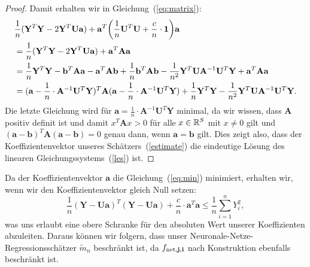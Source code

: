 \begin{proof}
Damit erhalten wir in Gleichung~(\ref{eq:matrix}):
\begin{equation*}
\begin{split}
& \frac{1}{n}(\mathbf{Y}^T\mathbf{Y} - 2\mathbf{Y}^T\mathbf{U}\mathbf{a}) + \mathbf{a}^T\bigg(\frac{1}{n} \mathbf{U}^T\mathbf{U} + \frac{c}{n} \cdot \mathbf{1}\bigg) \mathbf{a} \\
& = \frac{1}{n}(\mathbf{Y}^T\mathbf{Y} - 2\mathbf{Y}^T\mathbf{U}\mathbf{a}) + \mathbf{a}^T \mathbf{A} \mathbf{a} \\
& = \frac{1}{n}\mathbf{Y}^T\mathbf{Y} - \mathbf{b}^T\mathbf{A}\mathbf{a} - \mathbf{a}^T\mathbf{A}\mathbf{b} + \frac{1}{n}\mathbf{b}^T\mathbf{A}\mathbf{b} - \frac{1}{n^2}\mathbf{Y}^T\mathbf{U}\mathbf{A}^{-1}\mathbf{U}^T\mathbf{Y} + \mathbf{a}^T\mathbf{A}\mathbf{a} \\
& = (\mathbf{a} - \frac{1}{n} \cdot \mathbf{A}^{-1}\mathbf{U}^T\mathbf{Y})^T \mathbf{A} (\mathbf{a} - \frac{1}{n} \cdot \mathbf{A}^{-1} \mathbf{U}^T\mathbf{Y}) + \frac{1}{n}\mathbf{Y}^T\mathbf{Y} - \frac{1}{n^2}\mathbf{Y}^T\mathbf{U}\mathbf{A}^{-1}\mathbf{U}^T\mathbf{Y}.
\end{split} 
\end{equation*} 
Die letzte Gleichung wird für $\mathbf{a} = \frac{1}{n} \cdot \mathbf{A}^{-1}\mathbf{U}^T\mathbf{Y}$ minimal, 
da wir wissen, dass $\mathbf{A}$ positiv definit ist und damit $x^T\mathbf{A}x > 0$ für alle $x \in \mathbb{R}^S$ mit $x \neq 0$ gilt und $(\mathbf{a} - \mathbf{b})^T\mathbf{A}(\mathbf{a} - \mathbf{b}) = 0$ genau dann, wenn $\mathbf{a} = \mathbf{b}$ gilt.
Dies zeigt also, dass der Koeffizientenvektor unseres Schätzers~(\ref{estimate}) die eindeutige Lösung des linearen Gleichungssystems~(\ref{les}) ist.
\end{proof}
\begin{bemnumber}
\label{mtildebeschraenkt}
Da der Koeffizientenvektor $\mathbf{a}$ die Gleichung~(\ref{eq:min}) minimiert, erhalten wir, wenn wir den Koeffizientenvektor gleich Null setzen:
$$\frac{1}{n}(\mathbf{Y} - \mathbf{U}\mathbf{a})^T(\mathbf{Y} - \mathbf{U}\mathbf{a}) + \frac{c}{n} \cdot \mathbf{a}^T\mathbf{a} \leq \frac{1}{n} \sum_{i = 1}^n Y_i^2,$$
was uns erlaubt eine obere Schranke für den absoluten Wert unserer Koeffizienten abzuleiten. Daraus können wir folgern, dass unser Neuronale-Netze-Regressionsschätzer $\tilde{m}_n$ beschränkt ist, da $f_{\mathrm{net},\mathbf{j},\mathbf{i}}$ nach Konstruktion ebenfalls beschränkt ist.
\end{bemnumber}